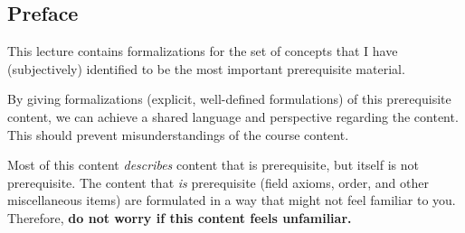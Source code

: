 \documentclass[letterpaper,twoside]{article}
\def\SmallHSpace{\hspace*{1mm}}
\newcommand{\Tldr}[1]{%
    \emoji{stopwatch} \textbf{Summary.}\SmallHSpace #1 \hfill $\square$
}
\newenvironment{SorrellEnumerate}
{
    \setlength\parskip{-5pt}
    \begin{enumerate}
        \setlength\itemsep{-4pt}
}{
    \end{enumerate}
}
\begin{document}
\newpage
{}
\tableofcontents
\newpage
\restoregeometry
{}
\setcounter{section}{-1}
\setcounter{page}{1}

\begin{multicols}{2}




\section{Preface}


This lecture contains formalizations for the set of concepts that I have (subjectively) identified to be the most important prerequisite material.

By giving formalizations (explicit, well-defined formulations) of this prerequisite content, we can achieve a shared language and perspective regarding the content.
This should prevent misunderstandings of the course content.

Most of this content \textit{describes} content that is prerequisite, but itself is not prerequisite.
The content that \textit{is} prerequisite (field axioms, order, and other miscellaneous items) are formulated in a way that might not feel familiar to you.
Therefore, \textbf{do not worry if this content feels unfamiliar.}


\end{multicols}
\end{document}
